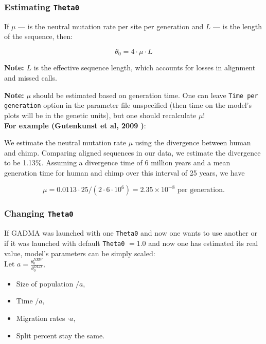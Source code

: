 \documentclass[12pt]{article}
\makeatletter
\newcommand{\py}[1]{\lstinline[language=Python, showstringspaces=False]@#1@}
\makeatother
\begin{document}
\subsubsection{Estimating \py{Theta0}}
\label{sec:est-theta}
If $\mu$ --- is the neutral mutation rate per site per generation and $L$ --- is the length of the sequence, then:

$$\theta_0 = 4 \cdot \mu \cdot L$$

\textbf{Note:} $L$ is the effective sequence length, which accounts for losses in alignment and missed calls.

\textbf{Note:} $\mu$ should be estimated based on generation time. One can leave \py{Time per generation} option in the parameter file unspecified (then time on the model's plots will be in the genetic units), but one should recalculate $\mu$! \\

\textbf{For example (Gutenkunst et al, 2009 \cite{gutenkunst2009})}:

\begin{displayquote}
We estimate the neutral mutation rate $\mu$ using the divergence between human and chimp. Comparing aligned sequences in our data, we estimate the divergence to be 1.13\%. Assuming a divergence time of 6 million years and a mean generation time for human and chimp over this interval of 25 years, we have

$$\mu = 0.0113 \cdot 25 / (2 \cdot 6 \cdot 10^6) = 2.35 \times 10^{-8}\text{ per generation}.$$
\end{displayquote}

\subsubsection{Changing \py{Theta0}}
\label{sec:change-theta}
If GADMA was launched with one \py{Theta0} and now one wants to use another or if it was launched with default \py{Theta0} $ = 1.0$ and now one has estimated its real value, model's parameters can be simply scaled:\\

Let  $a = \frac{\displaystyle \theta_0^{NEW}}{\displaystyle \theta_0^{OLD}},$
\begin{itemize}
    \item Size of population $/ a$,
    \item Time $/ a$,
    \item Migration rates $\cdot a$,
    \item Split percent stay the same.
\end{itemize}
\end{document}
